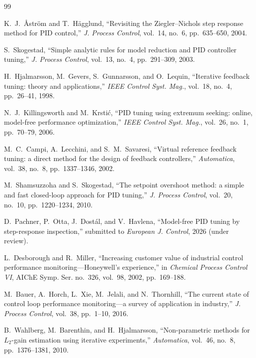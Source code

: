 \documentclass[letterpaper, 10 pt, conference]{ieeeconf}
\begin{document}
{\footnotesize
\begin{thebibliography}{99}

 K.~J.~\r{A}str\"om and T.~H\"agglund,
``Revisiting the Ziegler--Nichols step response method for PID control,''
\emph{J. Process Control}, vol.~14, no.~6, pp.~635--650, 2004.

 S.~Skogestad, ``Simple analytic rules for model
reduction and PID controller tuning,'' \emph{J. Process Control},
vol.~13, no.~4, pp.~291--309, 2003.

 H.~Hjalmarsson, M.~Gevers, S.~Gunnarsson, and
O.~Lequin, ``Iterative feedback tuning: theory and applications,''
\emph{IEEE Control Syst. Mag.}, vol.~18, no.~4, pp.~26--41, 1998.

 N.~J.~Killingsworth and M.~Krsti\'c, ``PID
tuning using extremum seeking: online, model-free performance
optimization,'' \emph{IEEE Control Syst. Mag.}, vol.~26, no.~1,
pp.~70--79, 2006.

 M.~C.~Campi, A.~Lecchini, and S.~M.~Savaresi,
``Virtual reference feedback tuning: a direct method for the design of
feedback controllers,'' \emph{Automatica}, vol.~38, no.~8,
pp.~1337--1346, 2002.

 M.~Shamsuzzoha and S.~Skogestad, ``The setpoint
overshoot method: a simple and fast closed-loop approach for PID tuning,''
\emph{J. Process Control}, vol.~20, no.~10, pp.~1220--1234, 2010.

 D.~Pachner, P.~Otta, J.~Dost\'al, and V.~Havlena,
``Model-free PID tuning by step-response inspection,'' submitted to
\emph{European J. Control}, 2026 (under review).

 L.~Desborough and R.~Miller, ``Increasing
customer value of industrial control performance monitoring---Honeywell's
experience,'' in \emph{Chemical Process Control VI}, AIChE Symp. Ser.
no.~326, vol.~98, 2002, pp.~169--188.

 M.~Bauer, A.~Horch, L.~Xie, M.~Jelali, and
N.~Thornhill, ``The current state of control loop performance
monitoring---a survey of application in industry,'' \emph{J. Process
Control}, vol.~38, pp.~1--10, 2016.

 B.~Wahlberg, M.~Barenthin, and H.~Hjalmarsson,
``Non-parametric methods for $L_2$-gain estimation using iterative
experiments,'' \emph{Automatica}, vol.~46, no.~8, pp.~1376--1381, 2010.


\end{thebibliography}}
\end{document}
